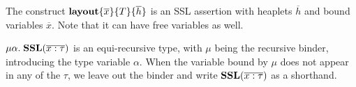 The construct $\textbf{layout}\{ \overline{x} \}\{ T \}\{ \overline{h} \}$ is an SSL assertion with heaplets $\overline{h}$ and
bound variables $\overline{x}$. Note that it can have free variables as well.

$\mu\alpha.\; \textbf{SSL}(\overline{x : \tau})$ is an equi-recursive type, with $\mu$ being the recursive binder,
introducing the type variable $\alpha$. When
the variable bound by $\mu$ does not appear in any of the $\tau$, we leave out the binder and write $\textbf{SSL}(\overline{x : \tau})$
as a shorthand.




%
%
%
%
%
